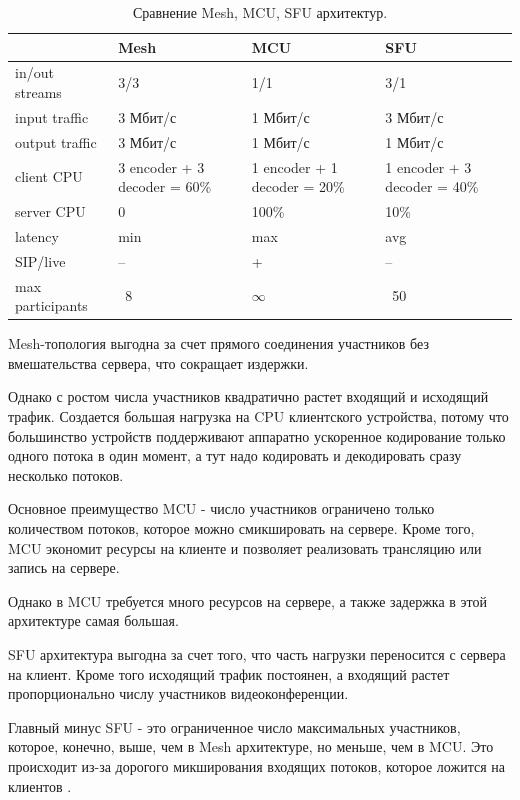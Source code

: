 
\begin{center}
    \begin{longtable}{|p{4cm}|p{3cm}|p{3cm}|p{3cm}|}
    \caption{Сравнение Mesh, MCU, SFU архитектур.}\\
    \hline
     & Mesh & MCU & SFU\\ 
    \hline 
    in/out streams & 3/3 & 1/1 & 3/1\\
    \hline
    input traffic & 3 Мбит/с & 1 Мбит/с & 3 Мбит/с\\
    \hline
    output traffic & 3 Мбит/с & 1 Мбит/с & 1 Мбит/с\\
    \hline
    client CPU & 3 encoder + 3 decoder = 60\% & 1 encoder + 1 decoder = 20\% & 1 encoder + 3 decoder = 40\%\\
    \hline
    server CPU & 0 & 100\% & 10\%\\
    \hline
    latency & min & max & avg\\
    \hline
    SIP/live & -- & + & --\\
    \hline
    max participants & ~8 & $\infty$ & ~50\\
    \hline
    \end{longtable}
\end{center}


Mesh-топология выгодна за счет прямого соединения участников без вмешательства сервера, что сокращает издержки. 

Однако с ростом числа участников квадратично растет входящий и исходящий трафик. Создается большая нагрузка на CPU клиентского устройства, потому что большинство устройств поддерживают аппаратно ускоренное кодирование только одного потока в один момент, а тут надо кодировать и декодировать сразу несколько потоков.


Основное преимущество MCU - число участников ограничено только количеством потоков, которое можно смикшировать на сервере. Кроме того, MCU экономит ресурсы на клиенте и позволяет реализовать трансляцию или запись на сервере.

Однако в MCU требуется много ресурсов на сервере, а также задержка в этой архитектуре самая большая.


SFU архитектура выгодна за счет того, что часть нагрузки переносится с сервера на клиент. Кроме того исходящий трафик постоянен, а входящий растет пропорционально числу участников видеоконференции.

Главный минус SFU - это ограниченное число максимальных участников, которое, конечно, выше, чем в Mesh архитектуре, но меньше, чем в MCU. Это происходит из-за дорогого микширования входящих потоков, которое ложится на клиентов \cite{v20}.

\pagebreak